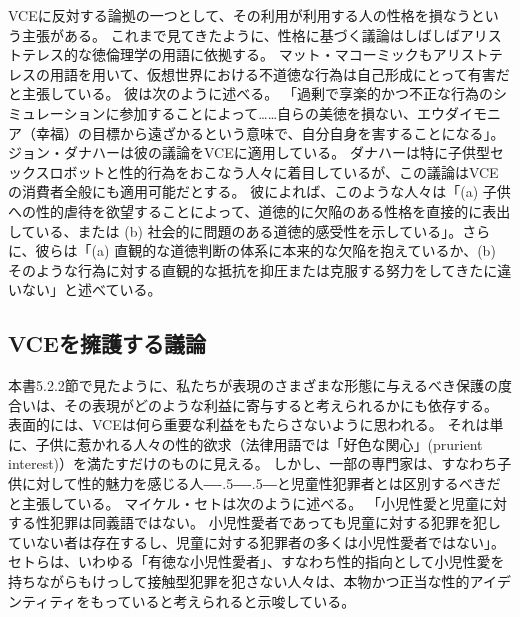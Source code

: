 \documentclass[paper=a4,book,openany]{jlreq}
\def\DDASH{―\kern-.5\zw―\kern-.5\zw―} %
\begin{document}
VCEに反対する論拠の一つとして、その利用が利用する人の性格を損なうという主張がある。
これまで見てきたように、性格に基づく議論はしばしばアリストテレス的な徳倫理学の用語に依拠する。
マット・マコーミックもアリストテレスの用語を用いて、仮想世界における不道徳な行為は自己形成にとって有害だと主張している。
彼は次のように述べる。
「過剰で享楽的かつ不正な行為のシミュレーションに参加することによって……自らの美徳を損ない、エウダイモニア（幸福）の目標から遠ざかるという意味で、自分自身を害することになる」\citep[p.278]{mccormick01:_is_it_wrong_play_violen_video_games}。
ジョン・ダナハーは彼の議論をVCEに適用している。
ダナハーは特に子供型セックスロボットと性的行為をおこなう人々に着目しているが、この議論はVCEの消費者全般にも適用可能だとする。
彼によれば、このような人々は「(a) 子供への性的虐待を欲望することによって、道徳的に欠陥のある性格を直接的に表出している、または (b) 社会的に問題のある道徳的感受性を示している」。さらに、彼らは「(a) 直観的な道徳判断の体系に本来的な欠陥を抱えているか、(b) そのような行為に対する直観的な抵抗を抑圧または克服する努力をしてきたに違いない」と述べている\citep[p.86]{danaher17:_robot_rape_robot_child_sexual_abuse}。

\subsection{VCEを擁護する議論}

本書5.2.2節で見たように、私たちが表現のさまざまな形態に与えるべき保護の度合いは、その表現がどのような利益に寄与すると考えられるかにも依存する。
表面的には、VCEは何ら重要な利益をもたらさないように思われる。
それは単に、子供に惹かれる人々の性的欲求（法律用語では「好色な関心」(prurient interest)）を満たすだけのものに見える。
しかし、一部の専門家は、\ruby{小児性愛者}{ペドファイル}{\DDASH}すなわち子供に対して性的魅力を感じる人{\DDASH}と児童性犯罪者とは区別するべきだと主張している。
マイケル・セトは次のように述べる。
「小児性愛と児童に対する性犯罪は同義語ではない。
小児性愛者であっても児童に対する犯罪を犯していない者は存在するし、児童に対する犯罪者の多くは小児性愛者ではない」\citep{apabooks18:_michael_c}。
セトらは、いわゆる「有徳な小児性愛者」、すなわち性的指向として小児性愛を持ちながらもけっして接触型犯罪を犯さない人々は、本物かつ正当な性的アイデンティティをもっていると考えられると示唆している\citep{seto12:_is_pedop_sexual_orien}。
\end{document}
